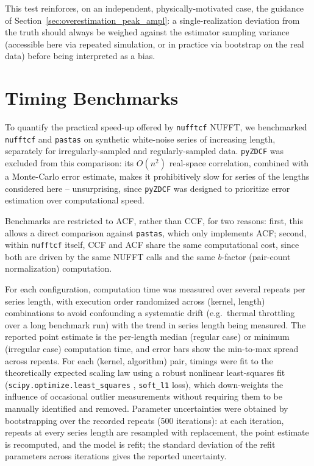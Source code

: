 \documentclass[twocolumn,10pt]{article}
\newcommand{\nufftcf}{\texttt{nufftcf}\xspace}
\newcommand{\pastas}{\texttt{pastas}\xspace}
\newcommand{\pyzdcf}{\texttt{pyZDCF}\xspace}
\begin{document}
This test reinforces, on an independent, physically-motivated case, the guidance of
Section~\ref{sec:overestimation_peak_ampl}: a single-realization deviation from the
truth should always be weighed against the estimator sampling
variance (accessible here via repeated simulation, or in practice via
bootstrap on the real data) before being interpreted as a bias.
%
\section{Timing Benchmarks}
\label{sec:benchmarks}
To quantify the practical speed-up offered by \nufftcf NUFFT,
we benchmarked \nufftcf and \pastas on synthetic white-noise series of
increasing length, separately for irregularly-sampled and
regularly-sampled data. \pyzdcf was excluded from this comparison: its $O(n^2)$ real-space
correlation, combined with a Monte-Carlo error estimate, makes it
prohibitively slow for series of the lengths considered here --
unsurprising, since \pyzdcf was designed to prioritize
error estimation over computational speed. 

Benchmarks are restricted to ACF, rather than CCF, for two reasons:
first, this allows a direct comparison against \pastas, which only
implements ACF; second, within \nufftcf itself, CCF and ACF share the
same computational cost, since both are driven by the same NUFFT calls
and the same $b$-factor (pair-count normalization) computation.

For each configuration, computation time was measured over several
repeats per series length, with execution order randomized across
(kernel, length) combinations to avoid confounding a systematic drift
(e.g.\ thermal throttling over a long benchmark run) with the trend in
series length being measured. The reported point estimate is the
per-length median (regular case) or minimum (irregular case) computation
time, and error bars show the min-to-max spread across repeats. For each
(kernel, algorithm) pair, timings were fit to the theoretically expected scaling law using a
robust nonlinear least-squares fit (\texttt{scipy.optimize.least\_squares}
\cite{scipy2020}, \texttt{soft\_l1} loss), which down-weights the
influence of occasional outlier measurements without
requiring them to be manually identified and removed. Parameter
uncertainties were obtained by bootstrapping over the recorded repeats
(500 iterations): at each iteration, repeats at every series length are
resampled with replacement, the point estimate is recomputed, and the
model is refit; the standard deviation of the refit parameters across
iterations gives the reported uncertainty. 
\end{document}
